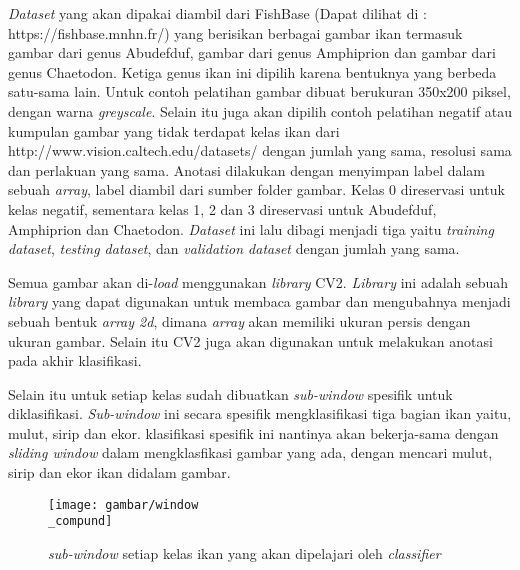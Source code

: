 \textit{Dataset} yang akan dipakai diambil dari FishBase (Dapat dilihat di \cite{fishbase}: https://fishbase.mnhn.fr/) yang 
berisikan berbagai gambar ikan termasuk gambar dari genus Abudefduf, gambar dari genus 
Amphiprion dan gambar dari genus Chaetodon. 
Ketiga genus ikan ini dipilih karena bentuknya yang berbeda satu-sama lain. %
Untuk contoh pelatihan gambar dibuat berukuran 350x200 piksel, 
dengan warna \textit{greyscale}. Selain itu juga akan dipilih contoh 
pelatihan negatif atau kumpulan gambar yang tidak terdapat kelas 
ikan dari http://www.vision.caltech.edu/datasets/ dengan jumlah yang sama, resolusi sama dan perlakuan 
yang sama. Anotasi dilakukan dengan menyimpan label dalam sebuah \textit{array}, label 
diambil dari sumber folder gambar. Kelas 0 direservasi untuk kelas negatif, sementara kelas 
1, 2 dan 3 direservasi untuk Abudefduf, Amphiprion dan Chaetodon.
\textit{Dataset} ini lalu dibagi menjadi tiga yaitu \textit{training dataset}, 
\textit{testing dataset}, dan \emph{validation dataset} dengan jumlah yang sama.

Semua gambar akan di-\textit{load} menggunakan \textit{library} CV2. \textit{Library} 
ini adalah sebuah \textit{library} yang dapat digunakan untuk membaca gambar dan mengubahnya 
menjadi sebuah bentuk \textit{array 2d}, dimana \textit{array} akan memiliki ukuran persis dengan 
ukuran gambar. Selain itu CV2 juga akan digunakan untuk melakukan anotasi pada akhir klasifikasi.

Selain itu untuk setiap kelas sudah dibuatkan \textit{sub-window} spesifik untuk diklasifikasi. 
\textit{Sub-window} ini secara spesifik mengklasifikasi tiga bagian ikan yaitu, mulut, sirip dan ekor. 
klasifikasi spesifik ini nantinya akan bekerja-sama dengan \textit{sliding window} dalam mengklasfikasi 
gambar yang ada, dengan mencari mulut, sirip dan ekor ikan didalam gambar.

\begin{figure}[H]
  \centering{}
	\texttt{[image: gambar/window\\\_compund]}
  \caption{\textit{sub-window} setiap kelas ikan yang akan dipelajari oleh \textit{classifier}}
\end{figure}


